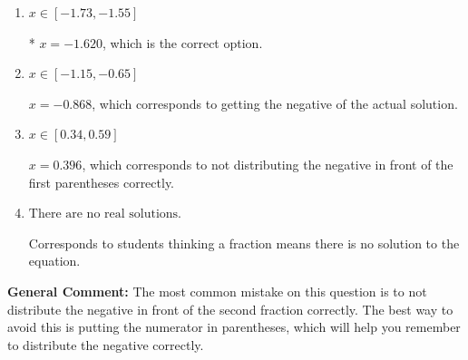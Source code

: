 \documentclass{extbook}[14pt]
\begin{document}
\begin{enumerate}
{\begin{enumerate}[label=\Alph*.]
$x = -0.396$, which corresponds to not distributing the negative in front of the second parentheses correctly.
\item \( x \in [-1.73, -1.55] \)

* $x = -1.620$, which is the correct option.
\item \( x \in [-1.15, -0.65] \)

$x = -0.868$, which corresponds to getting the negative of the actual solution.
\item \( x \in [0.34, 0.59] \)

$x = 0.396$, which corresponds to not distributing the negative in front of the first parentheses correctly.
\item \( \text{There are no real solutions.} \)

Corresponds to students thinking a fraction means there is no solution to the equation.
\end{enumerate}

\textbf{General Comment:} The most common mistake on this question is to not distribute the negative in front of the second fraction correctly. The best way to avoid this is putting the numerator in parentheses, which will help you remember to distribute the negative correctly.
}
\end{enumerate}
\end{document}

